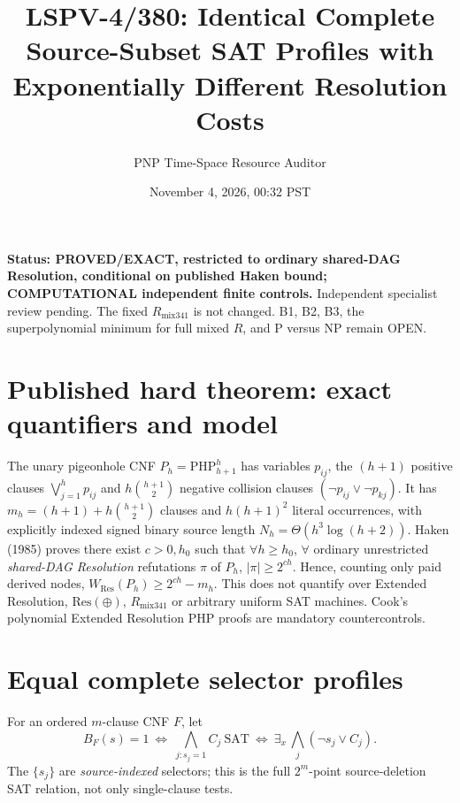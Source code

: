 \documentclass[11pt]{article}
\title{LSPV-4/380: Identical Complete Source-Subset SAT Profiles with Exponentially Different Resolution Costs}
\author{PNP Time-Space Resource Auditor}
\date{November 4, 2026, 00:32 PST}
\begin{document}
\maketitle
\noindent\textbf{Status: PROVED/EXACT, restricted to ordinary shared-DAG Resolution, conditional on published Haken bound; COMPUTATIONAL independent finite controls.} Independent specialist review pending. The fixed $R_{\mathrm{mix341}}$ is not changed. B1, B2, B3, the superpolynomial minimum for full mixed $R$, and P versus NP remain OPEN.

\section*{Published hard theorem: exact quantifiers and model}
The unary pigeonhole CNF $P_h=\mathrm{PHP}_{h+1}^{h}$ has variables $p_{ij}$, the $(h+1)$ positive clauses $\bigvee_{j=1}^h p_{ij}$ and $h\binom{h+1}{2}$ negative collision clauses $(\neg p_{ij}\lor\neg p_{kj})$. It has $m_h=(h+1)+h\binom{h+1}{2}$ clauses and $h(h+1)^2$ literal occurrences, with explicitly indexed signed binary source length $N_h=\Theta(h^3\log(h+2))$. Haken (1985) proves there exist $c>0,h_0$ such that $\forall h\ge h_0$, $\forall$ ordinary unrestricted \emph{shared-DAG Resolution} refutations $\pi$ of $P_h$, $|\pi|\ge2^{ch}$. Hence, counting only paid derived nodes, $W_{\mathrm{Res}}(P_h)\ge2^{ch}-m_h$. This does not quantify over Extended Resolution, $\mathrm{Res}(\oplus)$, $R_{\mathrm{mix341}}$ or arbitrary uniform SAT machines. Cook's polynomial Extended Resolution PHP proofs are mandatory countercontrols.

\section*{Equal complete selector profiles}
For an ordered $m$-clause CNF $F$, let
\[
B_F(s)=1\ \Longleftrightarrow\ \bigwedge_{j:s_j=1}C_j\ \mathrm{SAT}
\ \Longleftrightarrow\ \exists_x\,\bigwedge_j(\neg s_j\lor C_j).
\]
The $\{s_j\}$ are \emph{source-indexed} selectors; this is the full $2^m$-point source-deletion SAT relation, not only single-clause tests.
\end{document}
